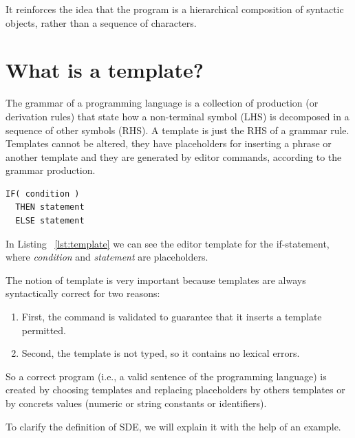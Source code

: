 \documentclass[
  oneside,
  11pt, a4paper,
  footinclude=true,
  headinclude=true,
  cleardoublepage=empty
]{scrbook}
\begin{document}
It reinforces the idea that the program is a hierarchical composition of syntactic objects, rather than a sequence of characters.

\section {What is a template?}

The grammar of a programming language is a collection of production (or derivation rules) that state how a non-terminal symbol (LHS) is decomposed in a sequence of other symbols (RHS). A template is just the RHS of a grammar rule.
Templates cannot be altered, they have placeholders for inserting a phrase or another template and they are generated by editor commands, according to the grammar production. %


\begin{lstlisting}[caption={Example of a IF Conditional template},label={lst:template}]
IF( condition )
  THEN statement
  ELSE statement
\end{lstlisting}

In Listing ~\ref{lst:template} we can see the editor template for the if-statement, where \textit{condition} and \textit{statement} are placeholders.

The notion of template is very important because templates are always syntactically correct for two reasons:

\begin{enumerate}
  \item First, the command is validated to guarantee that it inserts a template permitted. %

  \item Second, the template is not typed, so it contains no lexical errors.

\end{enumerate}

So a correct program (i.e., a valid sentence of the programming language) is created by choosing templates and replacing placeholders by others templates or by concrets values (numeric or string constants or identifiers).


To clarify the definition of SDE, we will explain it with the help of an example.
\end{document}
